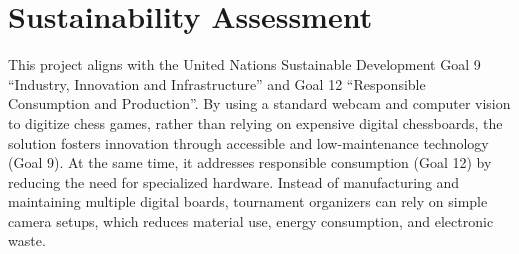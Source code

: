 



\section{Sustainability Assessment}
This project aligns with the United Nations Sustainable Development Goal 9 “Industry, Innovation and Infrastructure” and Goal 12 “Responsible Consumption and Production”. By using a standard webcam and computer vision to digitize chess games, rather than relying on expensive digital chessboards, the solution fosters innovation through accessible and low-maintenance technology (Goal 9). At the same time, it addresses responsible consumption (Goal 12) by reducing the need for specialized hardware. Instead of manufacturing and maintaining multiple digital boards, tournament organizers can rely on simple camera setups, which reduces material use, energy consumption, and electronic waste.

